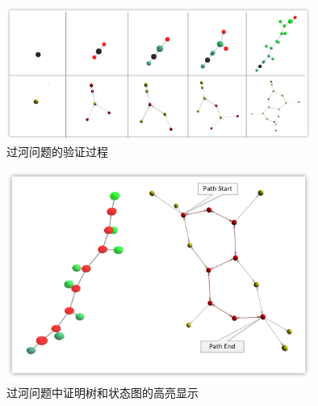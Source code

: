 	\begin{figure}[h!]
		\centering
		\includegraphics[width=10cm]{Img/river_prooftreegraph_step.png}
		\caption{过河问题的验证过程}
		\label{vmdv:river:step}
	\end{figure}
	\begin{figure}[h!]
		\centering
		\includegraphics[width=10cm]{Img/river_prooftreegraph_state_highlight.png}
		\caption{过河问题中证明树和状态图的高亮显示}
		\label{vmdv:river:path}
	\end{figure}

